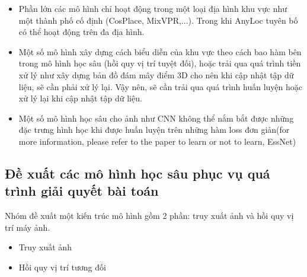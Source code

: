 \begin{itemize}
\begin{itemize}
        \item Phần lớn các mô hình chỉ hoạt động trong một loại địa hình khu vực như một thành phố cố định (CosPlace, MixVPR,...). Trong khi AnyLoc tuyên bố có thể hoạt động trên đa địa hình.
        \item Một số mô hình xây dựng cách biểu diễn của khu vực theo cách bao hàm bên trong mô hình học sâu (hồi quy vị trí tuyệt đối), hoặc trải qua quá trình tiền xử lý như xây dựng bản đồ đám mây điểm 3D cho nên khi cập nhật tập dữ liệu, sẽ cần phải xử lý lại. Vậy nên, sẽ cần trải qua quá trình huấn luyện hoặc xử lý lại khi cập nhật tập dữ liệu.
        \item Một số mô hình học sâu cho ảnh như CNN không thể nắm bắt được những đặc trưng hình học khi được huấn luyện trên những hàm loss đơn giản(for more information, please refer to the paper to learn or not to learn, EssNet)
    \end{itemize}
\end{itemize}

\subsection*{Đề xuất các mô hình học sâu phục vụ quá trình giải quyết bài toán}

Nhóm đề xuất một kiến trúc mô hình gồm 2 phần: truy xuất ảnh và hồi quy vị trí máy ảnh. 
\begin{itemize}
    \item Truy xuất ảnh
    \item Hồi quy vị trí tương đối
\end{itemize}


